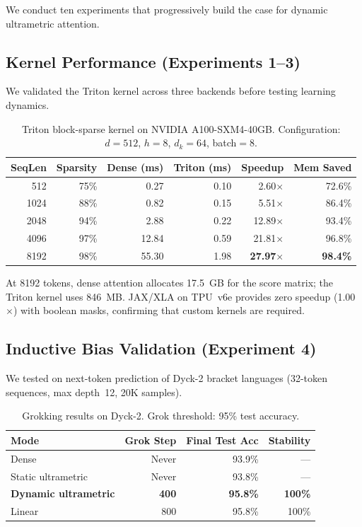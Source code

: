 \documentclass[11pt,a4paper]{article}
\begin{document}
We conduct ten experiments that progressively build the case for dynamic ultrametric attention.

\subsection{Kernel Performance (Experiments 1--3)}

We validated the Triton kernel across three backends before testing learning dynamics.

\begin{table}[h]
\centering
\caption{Triton block-sparse kernel on NVIDIA A100-SXM4-40GB. Configuration: $d=512$, $h=8$, $d_k=64$, batch$=8$.}
\label{tab:triton}
\begin{tabular}{@{}rrrrrr@{}}
\toprule
SeqLen & Sparsity & Dense (ms) & Triton (ms) & Speedup & Mem Saved \\
\midrule
512    & 75\%     & 0.27       & 0.10        & 2.60$\times$  & 72.6\% \\
1024   & 88\%     & 0.82       & 0.15        & 5.51$\times$  & 86.4\% \\
2048   & 94\%     & 2.88       & 0.22        & 12.89$\times$ & 93.4\% \\
4096   & 97\%     & 12.84      & 0.59        & 21.81$\times$ & 96.8\% \\
8192   & 98\%     & 55.30      & 1.98        & \textbf{27.97$\times$} & \textbf{98.4\%} \\
\bottomrule
\end{tabular}
\end{table}

At 8192 tokens, dense attention allocates 17.5~GB for the score matrix; the Triton kernel uses 846~MB. JAX/XLA on TPU~v6e provides zero speedup (1.00$\times$) with boolean masks, confirming that custom kernels are required.

\subsection{Inductive Bias Validation (Experiment 4)}

We tested on next-token prediction of Dyck-2 bracket languages (32-token sequences, max depth~12, 20K samples).

\begin{table}[h]
\centering
\caption{Grokking results on Dyck-2. Grok threshold: 95\% test accuracy.}
\label{tab:dyck2}
\begin{tabular}{@{}lrrr@{}}
\toprule
Mode & Grok Step & Final Test Acc & Stability \\
\midrule
Dense               & Never & 93.9\% & --- \\
Static ultrametric  & Never & 93.8\% & --- \\
\textbf{Dynamic ultrametric} & \textbf{400} & \textbf{95.8\%} & \textbf{100\%} \\
Linear              & 800   & 95.8\% & 100\% \\
\bottomrule
\end{tabular}
\end{table}
\end{document}
